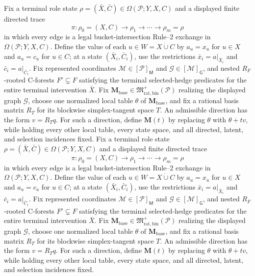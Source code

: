 Fix a terminal role state \(\rho=(\bar X,\bar C)\in\Omega(\mathcal P;Y,X,C)\) and a displayed finite directed trace
\[
 \pi:\rho_0=(X,C)\longrightarrow\rho_1\longrightarrow\cdots\longrightarrow\rho_m=\rho
\]
in which every edge is a legal bucket-intersection Rule--2 exchange in \(\Omega(\mathcal P;Y,X,C)\).  Define the value of each \(u\in W=X\mathbin{\dot\cup}C\) by \(a_u=x_u\) for \(u\in X\) and \(a_u=c_u\) for \(u\in C\); at a state \((\bar X_i,\bar C_i)\), use the restrictions \(\bar x_i=a|_{\bar X_i}\) and \(\bar c_i=a|_{\bar C_i}\).  Fix represented coordinates \(\mathcal M\in[\mathcal P]_{\mathsf M}\) and \(\mathcal G\in[\mathcal M]_{\mathsf G}\), and nested \(R_F\)-rooted C-forests \(F'\subsetneq F\) satisfying the terminal selected-hedge predicates for the entire terminal intervention \(\bar X\).  Fix \(\mathbf M_{\mathrm{base}}\in\mathfrak M_{\mathrm{rat,bin}}^+(\mathcal P)\) realizing the displayed graph \(\mathcal G\), choose one normalized local table \(\theta\) of \(\mathbf M_{\mathrm{base}}\), and fix a rational basis matrix \(R_T\) for its blockwise simplex-tangent space \(T\).  An admissible direction has the form \(v=R_Tq\).  For such a direction, define \(\mathbf M(t)\) by replacing \(\theta\) with \(\theta+t v\), while holding every other local table, every state space, and all directed, latent, and selection incidences fixed.
Fix a terminal role state \(\rho=(\bar X,\bar C)\in\Omega(\mathcal P;Y,X,C)\) and a displayed finite directed trace
\[
 \pi:\rho_0=(X,C)\longrightarrow\rho_1\longrightarrow\cdots\longrightarrow\rho_m=\rho
\]
in which every edge is a legal bucket-intersection Rule--2 exchange in \(\Omega(\mathcal P;Y,X,C)\).  Define the value of each \(u\in W=X\mathbin{\dot\cup}C\) by \(a_u=x_u\) for \(u\in X\) and \(a_u=c_u\) for \(u\in C\); at a state \((\bar X_i,\bar C_i)\), use the restrictions \(\bar x_i=a|_{\bar X_i}\) and \(\bar c_i=a|_{\bar C_i}\).  Fix represented coordinates \(\mathcal M\in[\mathcal P]_{\mathsf M}\) and \(\mathcal G\in[\mathcal M]_{\mathsf G}\), and nested \(R_F\)-rooted C-forests \(F'\subsetneq F\) satisfying the terminal selected-hedge predicates for the entire terminal intervention \(\bar X\).  Fix \(\mathbf M_{\mathrm{base}}\in\mathfrak M_{\mathrm{rat,bin}}^+(\mathcal P)\) realizing the displayed graph \(\mathcal G\), choose one normalized local table \(\theta\) of \(\mathbf M_{\mathrm{base}}\), and fix a rational basis matrix \(R_T\) for its blockwise simplex-tangent space \(T\).  An admissible direction has the form \(v=R_Tq\).  For such a direction, define \(\mathbf M(t)\) by replacing \(\theta\) with \(\theta+t v\), while holding every other local table, every state space, and all directed, latent, and selection incidences fixed.
